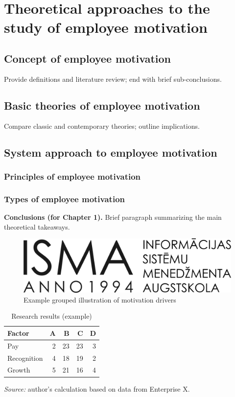 \chapter{Theoretical approaches to the study of employee motivation}
\section{Concept of employee motivation}
Provide definitions and literature review; end with brief sub-conclusions.

\section{Basic theories of employee motivation}
Compare classic and contemporary theories; outline implications.

\section{System approach to employee motivation}
\subsection{Principles of employee motivation}
\subsection{Types of employee motivation}

\noindent\textbf{Conclusions (for Chapter 1).} Brief paragraph summarizing the main theoretical takeaways.

\begin{figure}[h]
  \centering
  \includegraphics[width=0.7\linewidth]{b_chapters/chapter1/assets/isma_logo.png}
  \caption{Example grouped illustration of motivation drivers}
  \label{fig:motivation-drivers}
\end{figure}

{\singlespacing
\begin{table}[h]
  \caption{Research results (example)}
  \label{tab:research-results}
  \centering
  \begin{tabular}{lrrrr}
    \toprule
    Factor & A & B & C & D\\
    \midrule
    Pay & 2 & 23 & 23 & 3\\
    Recognition & 4 & 18 & 19 & 2\\
    Growth & 5 & 21 & 16 & 4\\
    \bottomrule
  \end{tabular}

  \vspace{2mm}
  \emph{Source:} author’s calculation based on data from Enterprise X.
\end{table}
}
